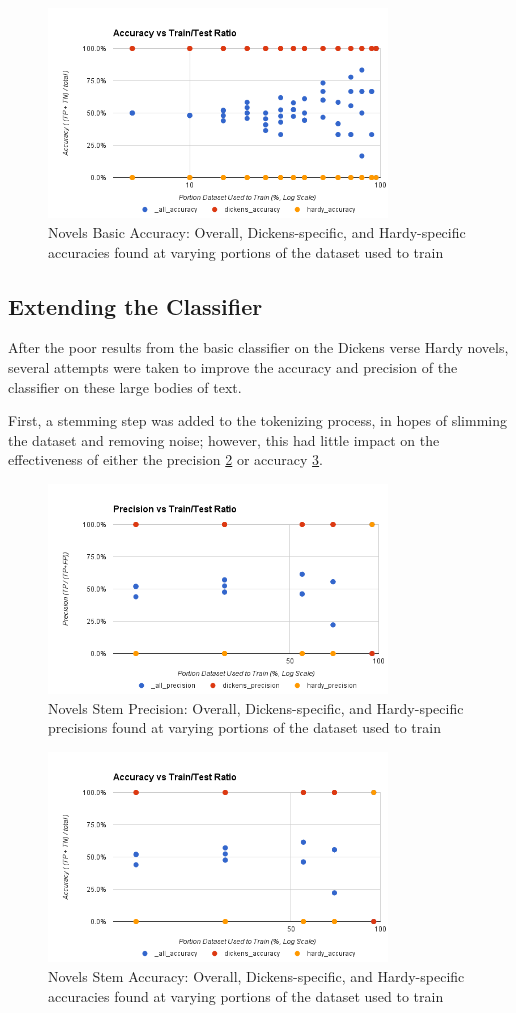 \begin{figure}[ht!]
    \centering
    \includegraphics[width=90mm]{img/novels_basic-accuracy.png}
    \caption{Novels Basic Accuracy: Overall, Dickens-specific, and Hardy-specific accuracies found at varying portions of the dataset used to train}
    \label{fig:novelBasicAccuracy}
\end{figure}


\subsection{Extending the Classifier}
\label{subsection:advancedResults}
After the poor results from the basic classifier on the Dickens verse Hardy novels, several attempts were taken to
improve the accuracy and precision of the classifier on these large bodies of text.

First, a stemming step was added to the tokenizing process, in hopes of slimming the dataset and removing noise;
however, this had little impact on the effectiveness of either the precision \ref{fig:novelsStemPrecision} or accuracy
\ref{fig:novelsStemAccuracy}.

\begin{figure}[ht!]
    \centering
    \includegraphics[width=90mm]{img/novels_stem-precision.png}
    \caption{Novels Stem Precision: Overall, Dickens-specific, and Hardy-specific precisions found at varying portions of the dataset used to train}
    \label{fig:novelsStemPrecision}
\end{figure}

\begin{figure}[ht!]
    \centering
    \includegraphics[width=90mm]{img/novels_stem-accuracy.png}
    \caption{Novels Stem Accuracy: Overall, Dickens-specific, and Hardy-specific accuracies found at varying portions of the dataset used to train}
    \label{fig:novelsStemAccuracy}
\end{figure}

